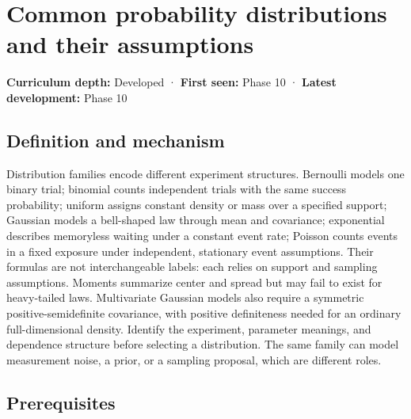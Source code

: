 \hypertarget{appendix-a2360b435383}{}\label{referencestart:appendix-a2360b435383}
\section{Common probability distributions and their assumptions}\label{appendix-a2360b435383-common-probability-distributions-and-their-assumptions}

\hypertarget{appendix-a2360b435383-common-probability-distributions-and-their-assumptions}{}

\textbf{Curriculum depth:} Developed · \textbf{First seen:} Phase 10 · \textbf{Latest development:} Phase 10

\begin{allmightroledefinition}

\subsection{Definition and mechanism}\label{appendix-a2360b435383-definition-and-mechanism}

\hypertarget{appendix-a2360b435383-definition-and-mechanism}{}

Distribution families encode different experiment structures. Bernoulli models one binary trial; binomial counts independent trials with the same success probability; uniform assigns constant density or mass over a specified support; Gaussian models a bell-shaped law through mean and covariance; exponential describes memoryless waiting under a constant event rate; Poisson counts events in a fixed exposure under independent, stationary event assumptions. Their formulas are not interchangeable labels: each relies on support and sampling assumptions. Moments summarize center and spread but may fail to exist for heavy-tailed laws. Multivariate Gaussian models also require a symmetric positive-semidefinite covariance, with positive definiteness needed for an ordinary full-dimensional density. Identify the experiment, parameter meanings, and dependence structure before selecting a distribution. The same family can model measurement noise, a prior, or a sampling proposal, which are different roles.

\end{allmightroledefinition}

\subsection{Prerequisites}\label{appendix-a2360b435383-prerequisites}

